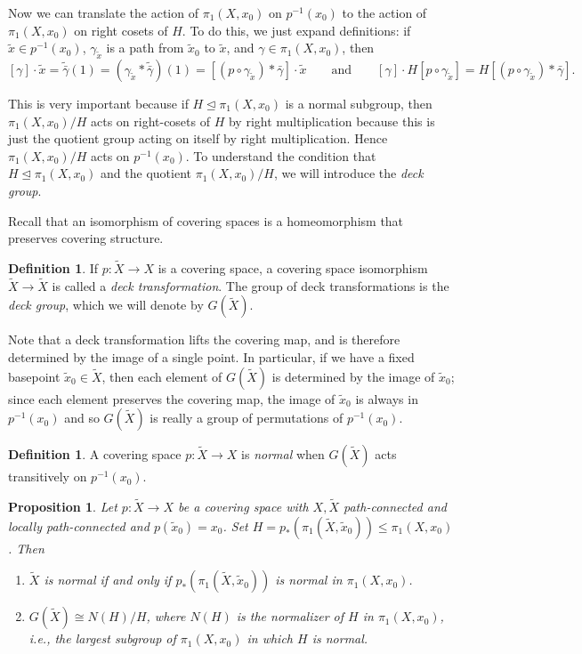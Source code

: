 \documentclass{article}
\newtheorem{prop}[thm]{Proposition}
\theoremstyle{definition}
\newtheorem{defi}[thm]{Definition}
\theoremstyle{remark}
\numberwithin{figure}{section}
\begin{document}
Now we can translate the action of $\pi_1(X, x_0)$ on $p^{-1}(x_0)$ to the action of $\pi_1(X, x_0)$ on right cosets of $H$. To do this, we just expand definitions: if $\tilde x \in p^{-1}(x_0)$, $\gamma_{\tilde x}$ is a path from $\tilde x_0$ to $\tilde x$, and $\gamma \in \pi_1(X, x_0)$, then
\[
[\gamma] \cdot \tilde x = \tilde{\bar\gamma}(1) = (\gamma_{\tilde x} * \tilde{\bar\gamma})(1) = [(p \circ \gamma_{\tilde x}) * \bar\gamma] \cdot \tilde x
\qquad\text{and}\qquad
[\gamma] \cdot H[p \circ \gamma_{\tilde x}] = H[(p \circ \gamma_{\tilde x}) * \bar\gamma].
\]

This is very important because if $H \trianglelefteq \pi_1(X, x_0)$ is a normal subgroup, then $\pi_1(X, x_0)/H$ acts on right-cosets of $H$ by right multiplication because this is just the quotient group acting on itself by right multiplication. Hence $\pi_1(X, x_0)/H$ acts on $p^{-1}(x_0)$. To understand the condition that $H \trianglelefteq \pi_1(X, x_0)$ and the quotient $\pi_1(X, x_0)/H$, we will introduce the \emph{deck group}.

Recall that an isomorphism of covering spaces is a homeomorphism that preserves covering structure.

\begin{defi}
	If $p : \tilde X \to X$ is a covering space, a covering space isomorphism $\tilde X \to \tilde X$ is called a \emph{deck transformation}. The group of deck transformations is the \emph{deck group}, which we will denote by $G(\tilde X)$.
\end{defi}

Note that a deck transformation lifts the covering map, and is therefore determined by the image of a single point. In particular, if we have a fixed basepoint $\tilde x_0 \in \tilde X$, then each element of $G(\tilde X)$ is determined by the image of $\tilde x_0$; since each element preserves the covering map, the image of $\tilde x_0$ is always in $p^{-1}(x_0)$ and so $G(\tilde X)$ is really a group of permutations of $p^{-1}(x_0)$.

\begin{defi}
	A covering space $p : \tilde X \to X$ is \emph{normal} when $G(\tilde X)$ acts transitively on $p^{-1}(x_0)$.
\end{defi}

\begin{prop}
	Let $p : \tilde X \to X$ be a covering space with $X, \tilde X$ path-connected and locally path-connected and $p(\tilde x_0) = x_0$. Set $H = p_*(\pi_1(\tilde X, \tilde x_0)) \leq \pi_1(X, x_0)$. Then
	\begin{enumerate}
		\item $\tilde X$ is normal if and only if $p_*(\pi_1(\tilde X, \tilde x_0))$ is normal in $\pi_1(X, x_0)$.
		\item $G(\tilde X) \cong N(H)/H$, where $N(H)$ is the normalizer of $H$ in $\pi_1(X, x_0)$, i.e., the largest subgroup of $\pi_1(X, x_0)$ in which $H$ is normal.
	\end{enumerate}
\end{prop}
\end{document}
